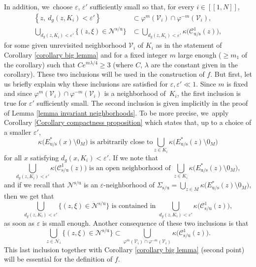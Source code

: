 \documentclass[JEP,XML,SOM,Unicode,NoEqCountersInSection,NoFloatCountersInSection,published]{cedram}
\newcommand{\lcr}{[\![}
\newcommand{\rcr}{]\!]}
\newcommand{\rs}{\mathrm{s}}
\newcommand{\ru}{\mathrm{u}}
\theoremstyle{definition}
\theoremstyle{plain}
\newcommand{\Ccal}{\mathcal{C}}
\newcommand{\Ncal}{\mathcal{N}}
\newcommand{\Vcal}{\mathcal{V}}
\begin{document}
In addition, we~choose $\varepsilon$, $\varepsilon'$ sufficiently small so that, for every $i\in\lcr1,N\rcr$,
\begin{align*}
\left\{ z, \: d_g (z,K_i) < \varepsilon' \right\} &\subset \varphi^m (\Vcal_i) \cap \varphi^{-m} (\Vcal_i), \\
\bigcup_{d_g (z,K_i) < \varepsilon'} \bigl\{ (z,\xi) \in \Ncal^{\rs/\ru} \bigr\} &\subset \bigcup_{d_g (z,K_i) < \varepsilon'} \kappa \bigl(\Ccal_{\ru/\rs}^1 (z) \bigr),
\end{align*}
for some given unrevisited neighborhood $\Vcal_i$ of $K_i$ as in the statement of Corollary \ref{corollary big lemma} and for a fixed integer $m$ large enough ($\geq m_1$ of the corollary) such that $C e^{m\lambda/4} \geq 3$ (where $C$, $\lambda$ are the constant given in the corollary). These two inclusions will be used in the construction of $f$. But first, let us briefly explain why these inclusions are satisfied for $\varepsilon, \varepsilon' \ll 1$. Since $m$ is fixed and since $\varphi^m (\Vcal_i) \cap \varphi^{-m} (\Vcal_i)$ is a neighborhood of~$K_i$, the first inclusion is true for $\varepsilon'$ sufficiently small. The second inclusion is given implicitly in the proof of Lemma \ref{lemma invariant neighborhoods}. To be more precise, we~apply Corollary \ref{Corollary compactness proposition} which states that, up to a choice of a smaller $\varepsilon'$,
\[
\kappa \bigl(E_{\ru/\rs}^* (x) \setminus 0_M \bigr) \text{ is arbitrarily close to} \bigcup_{z \in K_i} \kappa \bigl(E_{\ru/\rs}^* (z) \setminus 0_M \bigr)
\]
for all $x$ satisfying $d_g (x,K_i) < \varepsilon'$. If we note that
\[
\bigcup_{d_g (z,K_i) < \varepsilon'} \kappa \bigl(\Ccal_{\rs/\ru}^1 (z) \bigr) \text{ is an open neighborhood of } \bigcup_{z \in K_i} \kappa \bigl(E_{\ru/\rs}^* (z) \setminus 0_M \bigr),
\]
and if we recall that $\Ncal^{\rs/\ru}$ is an $\varepsilon$-neighborhood of $\Sigma_{\rs/\ru} = \bigcup_{z \in M} \kappa \bigl(E_{\ru/\rs}^* (z) \setminus 0_M \bigr)$, then we get that
\[
\bigcup_{ d_g (z,K_i) < \varepsilon'}\bigl\{ (z,\xi) \in \Ncal^{\rs/\ru} \bigr\} \text{ is contained in } \bigcup_{d_g (z,K_i) < \varepsilon'} \kappa \bigl(\Ccal_{\rs/\ru}^1 (z) \bigr),
\]
as soon as $\varepsilon$ is small enough. Another consequence of these two inclusions is that
\begin{equation}\label{eq: proof escape function - inclusion of neighborhoods}
\bigcup_{z \in \Ncal_i} \bigl\{ (z,\xi) \in \Ncal^{\rs/\ru} \bigr\} \subset \bigcup_{\varphi^m (\Vcal_i) \cap \varphi^{-m} (\Vcal_i)} \kappa \bigl(\Ccal_{\rs/\ru}^1 (z) \bigr).
\end{equation}
This last inclusion together with Corollary \ref{corollary big lemma} (second point) will be essential for the definition of $f$.
\end{document}

